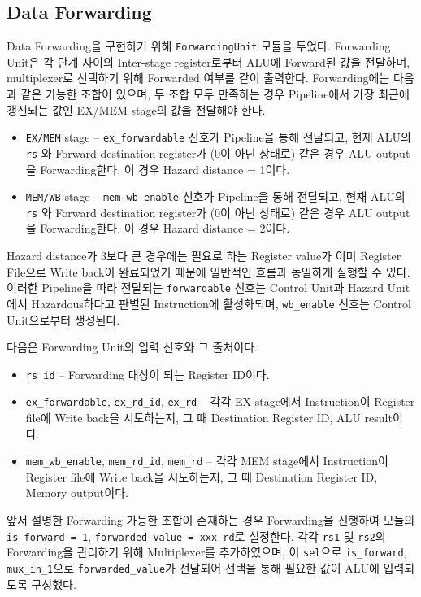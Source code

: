 \documentclass{scrartcl}
\begin{document}
\subsection{Data Forwarding}
Data Forwarding을 구현하기 위해 \texttt{ForwardingUnit} 모듈을 두었다. Forwarding Unit은 각 단계 사이의 Inter-stage register로부터 ALU에 Forward된 값을 전달하며, multiplexer로 선택하기 위해 Forwarded 여부를 같이 출력한다.
Forwarding에는 다음과 같은 가능한 조합이 있으며, 두 조합 모두 만족하는 경우 Pipeline에서 가장 최근에 갱신되는 값인 EX/MEM stage의 값을 전달해야 한다.
\begin{itemize}
  \item \texttt{EX/MEM} stage -- \texttt{ex\_forwardable} 신호가 Pipeline을 통해 전달되고, 현재 ALU의 \texttt{rs} 와 Forward destination register가 (0이 아닌 상태로) 같은 경우 ALU output을 Forwarding한다. 이 경우 Hazard distance = 1이다.
  \item \texttt{MEM/WB} stage -- \texttt{mem\_wb\_enable} 신호가 Pipeline을 통해 전달되고, 현재 ALU의 \texttt{rs} 와 Forward destination register가 (0이 아닌 상태로) 같은 경우 ALU output을 Forwarding한다. 이 경우 Hazard distance = 2이다.
\end{itemize}

Hazard distance가 3보다 큰 경우에는 필요로 하는 Register value가 이미 Register File으로 Write back이 완료되었기 때문에 일반적인 흐름과 동일하게 실행할 수 있다.
이러한 Pipeline을 따라 전달되는 \texttt{forwardable} 신호는 Control Unit과 Hazard Unit에서 Hazardous하다고 판별된 Instruction에 활성화되며, \texttt{wb\_enable} 신호는 Control Unit으로부터 생성된다.

다음은 Forwarding Unit의 입력 신호와 그 출처이다.
\begin{itemize}
  \item \texttt{rs\_id} -- Forwarding 대상이 되는 Register ID이다.
  \item \texttt{ex\_forwardable}, \texttt{ex\_rd\_id}, \texttt{ex\_rd} -- 각각 EX stage에서 Instruction이 Register file에 Write back을 시도하는지, 그 때 Destination Register ID, ALU result이다.
  \item \texttt{mem\_wb\_enable}, \texttt{mem\_rd\_id}, \texttt{mem\_rd} -- 각각 MEM stage에서 Instruction이 Register file에 Write back을 시도하는지, 그 때 Destination Register ID, Memory output이다.
\end{itemize}

앞서 설명한 Forwarding 가능한 조합이 존재하는 경우 Forwarding을 진행하여 모듈의 \texttt{is\_forward = 1}, \texttt{forwarded\_value = xxx\_rd}로 설정한다.
각각 \texttt{rs1} 및 \texttt{rs2}의 Forwarding을 관리하기 위해 Multiplexer를 추가하였으며, 이 \texttt{sel}으로 \texttt{is\_forward},
\texttt{mux\_in\_1}으로 \texttt{forwarded\_value}가 전달되어 선택을 통해 필요한 값이 ALU에 입력되도록 구성했다.
\end{document}
